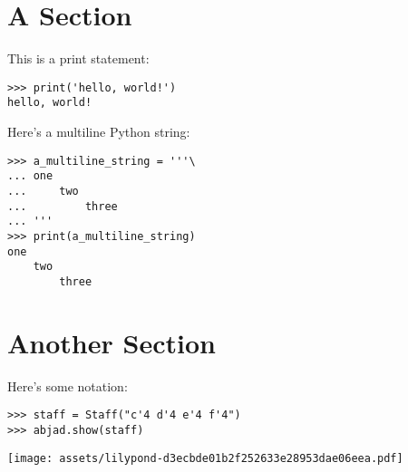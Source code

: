 \documentclass{article}
\begin{document}
\section{A Section}

This is a print statement:

\begin{comment}
<abjad>
print('hello, world!')
</abjad>
\end{comment}

\begin{singlespacing}
\begin{lstlisting}
>>> print('hello, world!')
hello, world!
\end{lstlisting}
\end{singlespacing}

Here's a multiline Python string:

\begin{comment}
<abjad>
a_multiline_string = '''\
one
    two
        three
'''
print(a_multiline_string)
</abjad>
\end{comment}

\begin{singlespacing}
\begin{lstlisting}
>>> a_multiline_string = '''\
... one
...     two
...         three
... '''
>>> print(a_multiline_string)
one
    two
        three
\end{lstlisting}
\end{singlespacing}

\section{Another Section}

Here's some notation:

\begin{comment}
<abjad>
staff = Staff("c'4 d'4 e'4 f'4")
abjad.show(staff)
</abjad>
\end{comment}

\begin{singlespacing}
\begin{lstlisting}
>>> staff = Staff("c'4 d'4 e'4 f'4")
>>> abjad.show(staff)
\end{lstlisting}
\noindent\texttt{[image: assets/lilypond-d3ecbde01b2f252633e28953dae06eea.pdf]}
\end{singlespacing}
\end{document}
